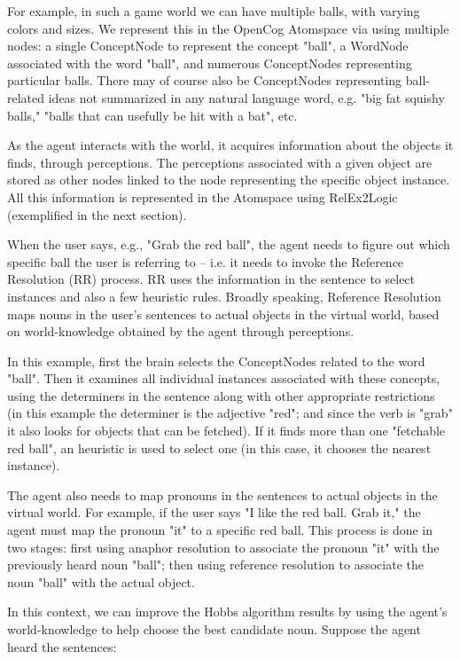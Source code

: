 For example, in such a game world we can have multiple balls, with varying colors and sizes. We represent this in the OpenCog Atomspace via using multiple nodes: a single ConceptNode to represent the concept "ball", a WordNode associated with the word "ball", and numerous ConceptNodes representing particular balls.   There may of course also be ConceptNodes representing ball-related ideas not summarized in any natural language word, e.g. "big fat squishy balls," "balls that can usefully be hit with a bat", etc.

As the agent interacts with the world, it acquires information about the objects it finds, through perceptions.  The perceptions associated with a given object are stored as other nodes linked to the node representing the specific object instance. All this information is represented in the Atomspace using RelEx2Logic (exemplified in the next section).

When the user says, e.g., "Grab the red ball", the agent needs to figure out which specific ball the user is referring to -- i.e. it needs to invoke the Reference Resolution (RR) process. RR uses the information in the sentence to select instances and also a few heuristic rules.  Broadly speaking, Reference Resolution maps nouns in the user's sentences to actual objects in the virtual world, based on world-knowledge obtained by the agent through perceptions.

In this example, first the brain selects the ConceptNodes related to the word "ball". Then it examines all individual instances associated with these concepts, using the determiners in the sentence along with other appropriate restrictions (in this example the determiner is the adjective "red"; and since the verb is "grab" it also looks for objects that can be fetched). If it finds more than one "fetchable red ball", an heuristic is used to select one (in this case, it chooses the nearest instance).

The agent also needs to map pronouns in the sentences to actual objects in the virtual world. For example, if the user says "I like the red ball. Grab it," the agent must map the pronoun "it" to a specific red ball. This process is done in two stages: first using anaphor resolution to associate the pronoun "it" with the previously heard noun "ball"; then using reference resolution to associate the noun "ball" with the actual object.  

In this context, we can improve the Hobbs algorithm results by using the agent's world-knowledge to help choose the best candidate noun. Suppose the agent heard the sentences:


